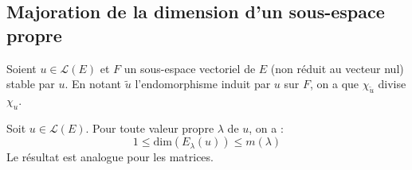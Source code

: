 \documentclass[a4paper,10pt]{report}
\begin{document}
\subsection{Majoration de la dimension d'un sous-espace propre}

\begin{prop}\label{stab2} Soient $u \in \mathcal{L}(E)$ et $F$ un sous-espace vectoriel de $E$ (non réduit au vecteur nul) stable par $u$. En notant $\tilde{u}$ l'endomorphisme induit par $u$ sur $F$, on a que $\chi_{\tilde{u}}$ divise $\chi_{u}$.
\end{prop} 

\begin{preuve} 
%

\vspace{7cm}
\end{preuve}

\begin{cor} Soit $u \in \mathcal{L}(E)$. Pour toute valeur propre $\lambda$ de $u$, on a :
$$ 1 \leq \textrm{dim}(E_{\lambda}(u)) \leq m(\lambda) $$
Le résultat est analogue pour les matrices.
\end{cor}
\end{document}
